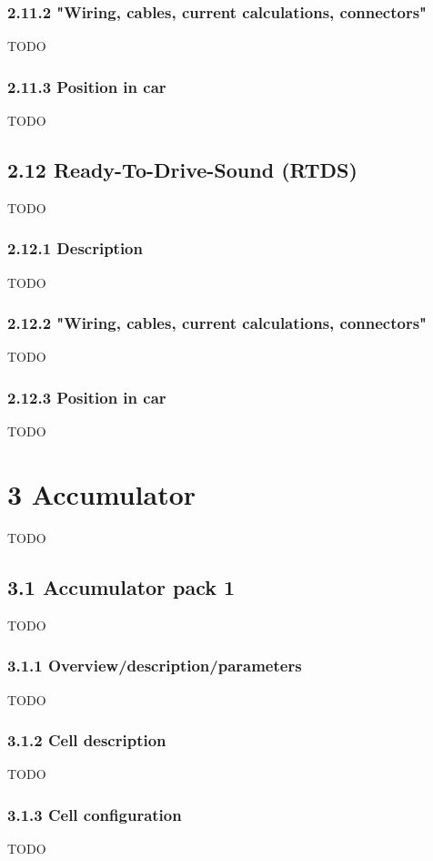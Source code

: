 \documentclass{article}
\begin{document}
\subsubsection*{2.11.2 "Wiring, cables, current calculations, connectors"}
TODO

\subsubsection*{2.11.3 Position in car}
TODO

\subsection*{2.12 Ready-To-Drive-Sound (RTDS)}
TODO

\subsubsection*{2.12.1 Description}
TODO

\subsubsection*{2.12.2 "Wiring, cables, current calculations, connectors"}
TODO

\subsubsection*{2.12.3 Position in car}
TODO

\section*{3 Accumulator}
TODO

\subsection*{3.1 Accumulator pack 1}
TODO

\subsubsection*{3.1.1 Overview/description/parameters}
TODO

\subsubsection*{3.1.2 Cell description}
TODO

\subsubsection*{3.1.3 Cell configuration}
TODO
\end{document}

